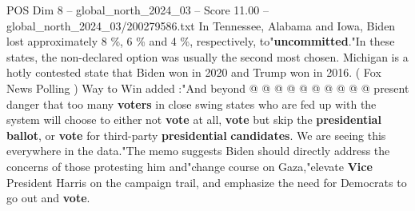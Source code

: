 \begin{textsample}{POS Dim 8 – global\_north\_2024\_03 – Score 11.00 – global\_north\_2024\_03/200279586.txt}
In Tennessee, Alabama and Iowa, Biden lost approximately 8 \%, 6 \% and 4 \%, respectively, to"\textbf{uncommitted}."In these states, the non-declared option was usually the second most chosen.
Michigan is a hotly contested state that Biden won in 2020 and Trump won in 2016. ( Fox News Polling ) Way to Win added :"And beyond @ @ @ @ @ @ @ @ @ @ present danger that too many \textbf{voters} in close swing states who are fed up with the system will choose to either not \textbf{vote} at all, \textbf{vote} but skip the \textbf{presidential} \textbf{ballot}, or \textbf{vote} for third-party \textbf{presidential} \textbf{candidates}.
We are seeing this everywhere in the data."The memo suggests Biden should directly address the concerns of those protesting him and"change course on Gaza,"elevate \textbf{Vice} President Harris on the campaign trail, and emphasize the need for Democrats to go out and \textbf{vote}.

\end{textsample}
